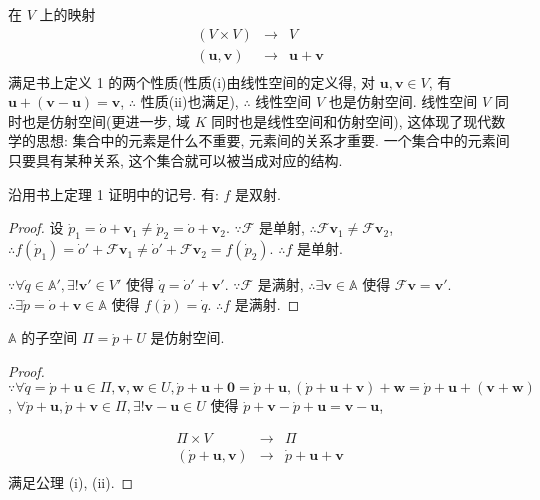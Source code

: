 \documentclass[color=black,device=normal,lang=cn,mode=geye]{elegantnote}
\begin{document}
在 $V$ 上的映射
\[\begin{array}{rcl}
    (V\times V) & \to & V \\
    (\boldsymbol{u},\boldsymbol{v}) & \to & \boldsymbol{u}+\boldsymbol{v} \\
\end{array}\]
满足书上定义 1 的两个性质(性质(i)由线性空间的定义得, 对 $\boldsymbol{u},\boldsymbol{v}\in V$, 有 $\boldsymbol{u}+(\boldsymbol{v}-\boldsymbol{u})=\boldsymbol{v}$, $\therefore$ 性质(ii)也满足), $\therefore$ 线性空间 $V$ 也是仿射空间. 线性空间 $V$ 同时也是仿射空间(更进一步, 域 $K$ 同时也是线性空间和仿射空间), 这体现了现代数学的思想: 集合中的元素是什么不重要, 元素间的关系才重要. 一个集合中的元素间只要具有某种关系, 这个集合就可以被当成对应的结构.
\begin{theorem}
    沿用书上定理 1 证明中的记号. 有: $f$ 是双射.
\end{theorem}
\begin{proof}
    设 $\dot{p}_1=\dot{o}+\boldsymbol{v}_1\neq\dot{p}_2=\dot{o}+\boldsymbol{v}_2$. $\because\mathcal{F}$ 是单射, $\therefore\mathcal{F}\boldsymbol{v}_1\neq\mathcal{F}\boldsymbol{v}_2$, $\therefore f(\dot{p}_1)=\dot{o}'+\mathcal{F}\boldsymbol{v}_1\neq\dot{o}'+\mathcal{F}\boldsymbol{v}_2=f(\dot{p}_2)$. $\therefore f$ 是单射.

    $\because\forall\dot{q}\in\mathbb{A}',\exists!\boldsymbol{v}'\in V'$ 使得 $\dot{q}=\dot{o}'+\boldsymbol{v}'$. $\because\mathcal{F}$ 是满射, $\therefore\exists\boldsymbol{v}\in\mathbb{A}$ 使得 $\mathcal{F}\boldsymbol{v}=\boldsymbol{v}'$. $\therefore\exists\dot{p}=\dot{o}+\boldsymbol{v}\in\mathbb{A}$ 使得 $f(\dot{p})=\dot{q}$. $\therefore f$ 是满射.
\end{proof}
\begin{theorem}[书上的定理 3]
    $\mathbb{A}$ 的子空间 $\varPi=\dot{p}+U$ 是仿射空间.
\end{theorem}
\begin{proof}
    $\because\forall\dot{q}=\dot{p}+\boldsymbol{u}\in\varPi,\boldsymbol{v},\boldsymbol{w}\in U,\dot{p}+\boldsymbol{u}+\boldsymbol{0}=\dot{p}+\boldsymbol{u},(\dot{p}+\boldsymbol{u}+\boldsymbol{v})+\boldsymbol{w}=\dot{p}+\boldsymbol{u}+(\boldsymbol{v}+\boldsymbol{w})$, $\forall\dot{p}+\boldsymbol{u},\dot{p}+\boldsymbol{v}\in\varPi,\exists!\boldsymbol{v}-\boldsymbol{u}\in U$ 使得 $\dot{p}+\boldsymbol{v}-\dot{p}+\boldsymbol{u}=\boldsymbol{v}-\boldsymbol{u}$,

    \[\begin{array}{rcl}
        \varPi\times V & \to & \varPi \\
        (\dot{p}+\boldsymbol{u},\boldsymbol{v}) & \to & \dot{p}+\boldsymbol{u}+\boldsymbol{v} \\
    \end{array}\]
    满足公理 (i), (ii).
\end{proof}
\end{document}
